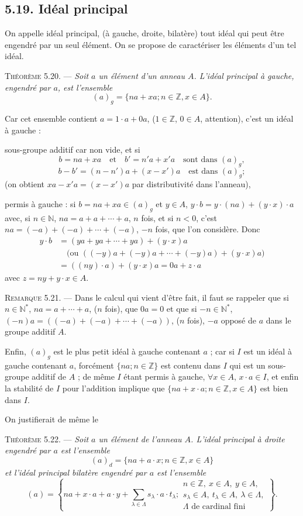 \subsection*{5.19. Idéal principal}
On appelle idéal principal, (à gauche, droite, bilatère) tout idéal qui peut être engendré par un seul élément. On se propose de caractériser les éléments d'un tel idéal.

\medskip\noindent\textsc{Théorème 5.20.} --- \emph{Soit $a$ un élément d'un anneau $A$. L'idéal principal à gauche, engendré par $a$, est l'ensemble
\[
(a)_g=\{na+xa;n\in\mathbb Z,x\in A\}.
\]}

Car cet ensemble contient $a=1\cdot a+0a$, ($1\in\mathbb Z$, $0\in A$, attention), c'est un idéal à gauche :

sous-groupe additif car non vide, et si
\[
b=na+xa\quad\text{et}\quad b'=n'a+x'a\quad\text{sont dans }(a)_g,
\]
\[
b-b'=(n-n')a+(x-x')a\quad\text{est dans }(a)_g;
\]
(on obtient $xa-x'a=(x-x')a$ par distributivité dans l'anneau),

permis à gauche : si $b=na+xa\in(a)_g$ et $y\in A$, $y\cdot b=y\cdot(na)+(y\cdot x)\cdot a$ avec, si $n\in\mathbb N$, $na=a+a+\cdots+a$, $n$ fois, et si $n<0$, c'est $na=(-a)+(-a)+\cdots+(-a)$, $-n$ fois, que l'on considère. Donc
\begin{align*}
y\cdot b&=(ya+ya+\cdots+ya)+(y\cdot x)a\\
&\quad\text{(ou }((-y)a+(-y)a+\cdots+(-y)a)+(y\cdot x)a\text{)}\\
&=((ny)\cdot a)+(y\cdot x)a=0a+z\cdot a
\end{align*}
avec $z=ny+y\cdot x\in A$.

\medskip\noindent\textsc{Remarque 5.21.} --- Dans le calcul qui vient d'être fait, il faut se rappeler que si $n\in\mathbb N^*$, $na=a+\cdots+a$, ($n$ fois), que $0a=0$ et que si $-n\in\mathbb N^*$, $(-n)a=((-a)+(-a)+\cdots+(-a))$, ($n$ fois), $-a$ opposé de $a$ dans le groupe additif $A$.

Enfin, $(a)_g$ est le plus petit idéal à gauche contenant $a$ ; car si $I$ est un idéal à gauche contenant $a$, forcément $\{na;n\in\mathbb Z\}$ est contenu dans $I$ qui est un sous-groupe additif de $A$ ; de même $I$ étant permis à gauche, $\forall x\in A$, $x\cdot a\in I$, et enfin la stabilité de $I$ pour l'addition implique que $\{na+x\cdot a;n\in\mathbb Z,x\in A\}$ est bien dans $I$. \bookend

On justifierait de même le

\medskip\noindent\textsc{Théorème 5.22.} --- \emph{Soit $a$ un élément de l'anneau $A$. L'idéal principal à droite engendré par $a$ est l'ensemble
\[
(a)_d=\{na+a\cdot x;n\in\mathbb Z,x\in A\}
\]
et l'idéal principal bilatère engendré par $a$ est l'ensemble
\[
(a)=\left\{na+x\cdot a+a\cdot y+\sum_{\lambda\in\Lambda}s_\lambda\cdot a\cdot t_\lambda;
\begin{array}{l}
n\in\mathbb Z,\ x\in A,\ y\in A,\\
s_\lambda\in A,\ t_\lambda\in A,\ \lambda\in\Lambda,\\
\Lambda\text{ de cardinal fini}
\end{array}\right\}.
\]}

